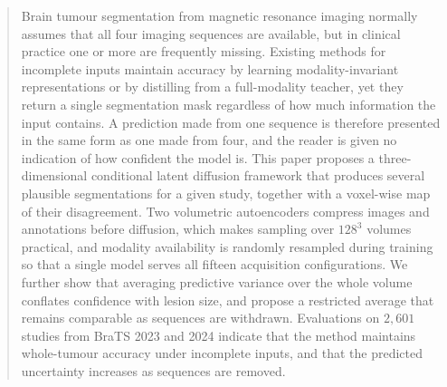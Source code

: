 \begin{abstract}

%
%

Brain tumour segmentation from magnetic resonance imaging normally assumes
that all four imaging sequences are available, but in clinical practice one or
more are frequently missing. Existing methods for incomplete inputs maintain
accuracy by learning modality-invariant representations or by distilling from
a full-modality teacher, yet they return a single segmentation mask regardless
of how much information the input contains. A prediction made from one
sequence is therefore presented in the same form as one made from four, and
the reader is given no indication of how confident the model is. This paper
proposes a three-dimensional conditional latent diffusion framework that
produces several plausible segmentations for a given study, together with a
voxel-wise map of their disagreement. Two volumetric autoencoders compress
images and annotations before diffusion, which makes sampling over $128^{3}$
volumes practical, and modality availability is randomly resampled during
training so that a single model serves all fifteen acquisition
configurations. We further show that averaging predictive variance over the
whole volume conflates confidence with lesion size, and propose a restricted
average that remains comparable as sequences are withdrawn. Evaluations on
$2{,}601$ studies from BraTS 2023 and 2024 indicate that the method maintains
whole-tumour accuracy under incomplete inputs, and that the predicted
uncertainty increases as sequences are removed.

\end{abstract}
